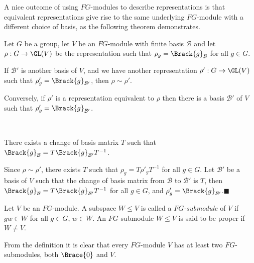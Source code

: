 \documentclass[../Project.tex]{subfiles}
\begin{document}
A nice outcome of using $FG$-modules to describe representations is that equivalent representations give rise to the same underlying $FG$-module with a different choice of basis, as the following theorem demonstrates.

\begin{theo}[{\cite[Theorem 4.12]{2}}]
\label{5}
	Let $G$ be a group, let $V$ be an $FG$-module with finite basis $\mathcal{B}$ and let $\rho : G \to \GL(V)$ be the representation such that $\rho_g = \Brack{g}_\mathcal{B}$ for all $g \in G$.
	\begin{menum}
	\item If $\mathcal{B}'$ is another basis of $V$, and we have another representation $\rho' : G \to \GL(V)$ such that $\rho'_g = \Brack{g}_{\mathcal{B}'}$, then $\rho \sim \rho'$.
	\item Conversely, if $\rho'$ is a representation equivalent to $\rho$ then there is a basis $\mathcal{B}'$ of $V$ such that $\rho'_g = \Brack{g}_{\mathcal{B}'}$.
	\end{menum}
\end{theo}

\begin{proo*}[{\cite[Proposition 6.6]{2}}]~ %
\vspace{-\topsep}
	\begin{menum}
		\item There exists a change of basis matrix $T$ such that $\Brack{g}_\mathcal{B} = T\Brack{g}_{\mathcal{B}'}T^{-1}$.
		\item Since $\rho \sim \rho'$, there exists $T$ such that $\rho_g = T\rho'_gT^{-1}$ for all $g \in G$. Let $\mathcal{B}'$ be a basis of $V$ such that the change of basis matrix from $\mathcal{B}$ to $\mathcal{B}'$ is $T$, then $\Brack{g}_\mathcal{B} = T\Brack{g}_{\mathcal{B}'}T^{-1}$ for all $g \in G$, and $\rho'_g = \Brack{g}_{\mathcal{B}'}$.\hfill $\blacksquare$
	\end{menum}
\end{proo*}


\begin{defi}
	Let $V$ be an $FG$-module. A subspace $W \leqslant V$ is called a \textit{$FG$-submodule} of $V$ if $gw \in W$ for all $g \in G,\,w \in W$. An $FG$-submodule $W \leqslant V$ is said to be proper if $W \neq V$.
\end{defi}

From the definition it is clear that every $FG$-module $V$ has at least two $FG$-submodules, both $\Brace{0}$ and $V$.\\
\end{document}
